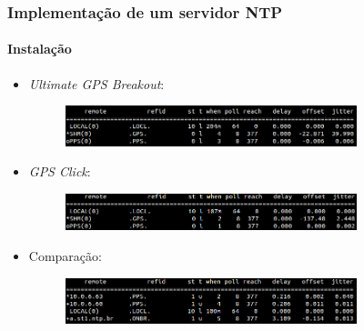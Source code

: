 \begin{frame}
\frametitle{Implementação de um servidor NTP}
\framesubtitle{Instalação}


\begin{itemize}
  \item \textit{Ultimate GPS Breakout}:
  \begin{figure}[h]
    \centering
    \includegraphics[width=0.80\textwidth]{image/adafruit_GPS}
    \label{img:adafruit} 
  \end{figure} 
  \item \textit{GPS Click}:
  \begin{figure}[h]
    \centering
    \includegraphics[width=0.80\textwidth]{image/mikroe}
    \label{img:mikroe} 
  \end{figure} 
  \item Comparação:
  \begin{figure}[h!]
    \centering
    \includegraphics[width=0.80\textwidth]{image/cliente-ntp}
    \label{img:cliente_ntp} 
\end{figure} 
\end{itemize}

\end{frame}

 
